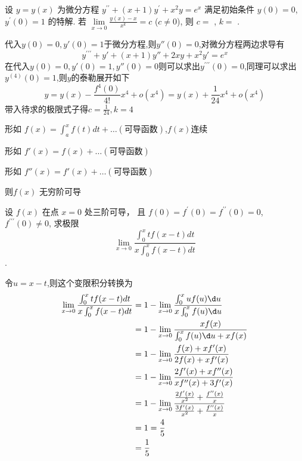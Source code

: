 \documentclass[12pt, a4paper, oneside, UTF8]{ctexbook}
\begin{document}
\begin{example}
    设 $ y=y(x) $ 为微分方程 $ y^{\prime\prime}+(x+1)y^{\prime}+x^{2}y=e^{x} $ 
    满足初始条件 $ y(0)=0 $, $ y^{\prime}(0)=1 $ 的特解.
    若 $ \lim\limits_{x\to 0}\frac{y(x)-x}{x^{k}}=c $ ($ c\neq 0 $),
    则 $ c= $ \underline{\quad}, $ k= $ \underline{\quad}.
\end{example}
\begin{solution}
    代入$y(0)=0, y'(0)=1$于微分方程,则$y''(0)=0$,对微分方程两边求导有
    \[
    y^{\prime\prime\prime} + y' + (x+1)y'' + 2xy + x^2 y' = e^x
    \]
    在代入$y(0)=0, y'(0)=1,y''(0)=0$则可以求出$y^{\prime\prime\prime}(0)=0$,同理可以求出
    $y^{(4)}(0)=1$,则$y$的泰勒展开如下
    \[
    y=y(x)-\frac{f^{4}(0)}{4!}x^4 + o(x^4) = y(x) + \frac{1}{24}x^4 + o(x^4)
    \]
    带入待求的极限式子得$c=\frac{1}{24},k=4$
\end{solution}
\begin{remark} 
    形如 $f(x)=\int_{a}^{x}f(t)dt+\ldots (\text{可导函数})$,$f(x)$连续

    形如 $f'(x)=f(x)+\ldots(\text{可导函数})$

    形如 $f''(x)=f'(x)+\ldots(\text{可导函数})$

    则$f(x)$ 无穷阶可导
\end{remark}
\begin{example}
    设 $ f(x) $ 在点 $ x=0 $ 处三阶可导，
    且 $ f(0)=f^{\prime}(0)=f^{\prime\prime}(0)=0 $, 
    $ f^{\prime\prime\prime}(0)\neq 0 $,
    求极限 
    \[ 
    \lim\limits_{x\to 0}\frac{\int_{0}^{x}tf(x-t)dt}{x\int_{0}^{x}f(x-t)dt}
    \].
\end{example}
\begin{solution}
    令$u=x-t$,则这个变限积分转换为
    \begin{align*}
        \lim\limits_{x\to 0}\frac{\int_{0}^{x}tf(x-t)dt}{x\int_{0}^{x}f(x-t)dt} 
        & = 1 - \lim_{x\to 0}\frac{\int_{0}^{x}uf(u)\d u}{x\int_{0}^{x}f(u)\d u} \\
        & = 1 - \lim_{x\to 0}\frac{xf(x)}{\int_{0}^{x}f(u)\d u + xf(x)} \\
        & = 1 - \lim_{x\to 0}\frac{f(x)+xf'(x)}{2f(x)+xf'(x)} \\
        & = 1 - \lim_{x\to 0}\frac{2f'(x)+xf''(x)}{xf''(x)+3f'(x)} \\
        & = 1 - \lim_{x \to 0} \frac{\frac{2f'(x)}{x^{2}} + \frac{f''(x)}{x}}{\frac{3f'(x)}{x^{2}} + \frac{f''(x)}{x}} \\
        & = 1 = \frac{4}{5} \\
        & = \frac{1}{5}
    \end{align*}
\end{solution}
\end{document}
